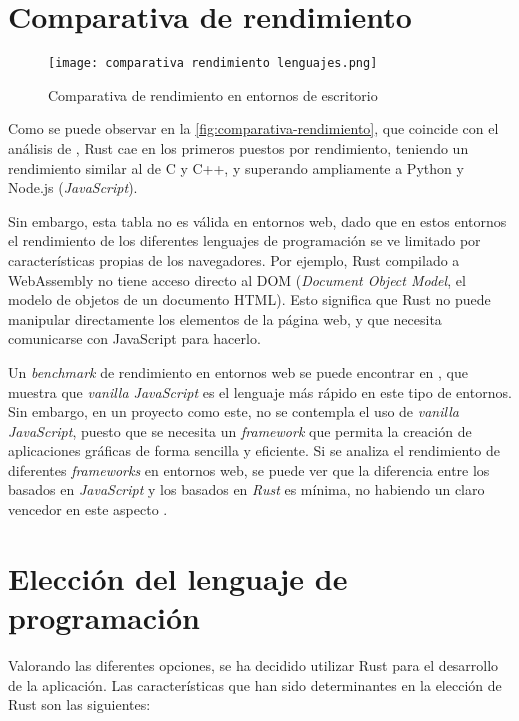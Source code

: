 \section{Comparativa de rendimiento}

\begin{figure}[H]
    \centering
    \texttt{[image: comparativa rendimiento lenguajes.png]}
    \caption{Comparativa de rendimiento en entornos de escritorio \autocite{zotero-253}}
    \label{fig:comparativa-rendimiento}
\end{figure}


\noindent Como se puede observar en la \autoref{fig:comparativa-rendimiento}, que coincide con el análisis de \autocite{samTop10Fastest2024}, Rust cae en los primeros puestos por rendimiento, teniendo un rendimiento similar al de C y C++, y superando ampliamente a Python y Node.js (\textit{JavaScript}).

Sin embargo, esta tabla no es válida en entornos web, dado que en estos entornos el rendimiento de los diferentes lenguajes de programación se ve limitado por características propias de los navegadores. Por ejemplo, Rust compilado a WebAssembly no tiene acceso directo al DOM (\textit{Document Object Model}, el modelo de objetos de un documento HTML). Esto significa que Rust no puede manipular directamente los elementos de la página web, y que necesita comunicarse con JavaScript para hacerlo. 

Un \textit{benchmark} de rendimiento en entornos web se puede encontrar en \autocite{InteractiveResults}, que muestra que \textit{vanilla JavaScript} es el lenguaje más rápido en este tipo de entornos. Sin embargo, en un proyecto como este, no se contempla el uso de \textit{vanilla JavaScript}, puesto que se necesita un \textit{framework} que permita la creación de aplicaciones gráficas de forma sencilla y eficiente. Si se analiza el rendimiento de diferentes \textit{frameworks} en entornos web, se puede ver que la diferencia entre los basados en \textit{JavaScript} y los basados en \textit{Rust} es mínima, no habiendo un claro vencedor en este aspecto \autocite{InteractiveResults}.

\section{Elección del lenguaje de programación}

\noindent Valorando las diferentes opciones, se ha decidido utilizar Rust para el desarrollo de la aplicación. Las características que han sido determinantes en la elección de Rust son las siguientes:


